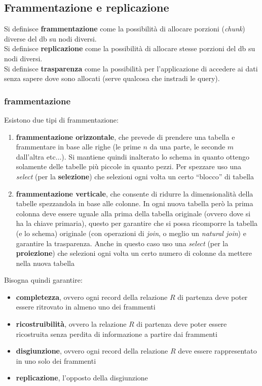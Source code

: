 \documentclass[a4paper,12pt, oneside]{book}
\begin{document}
\subsection{Frammentazione e replicazione}
Si definisce \textbf{frammentazione} come la possibilità di allocare porzioni
(\textit{chunk}) diverse del db su nodi diversi.\\
Si definisce \textbf{replicazione} come la possibilità di allocare stesse
porzioni del db su nodi diversi.\\
Si definisce \textbf{trasparenza} come la possibilità per l'applicazione di
accedere ai dati senza sapere dove sono allocati (serve qualcosa che instradi le
query).
\subsubsection{frammentazione}
Esistono due tipi di frammentazione:
\begin{enumerate}
  \item \textbf{frammentazione orizzontale}, che prevede di prendere una tabella
  e frammentare in base alle righe (le prime $n$ da una parte, le seconde $m$
  dall'altra etc$\ldots$). Si mantiene quindi inalterato lo schema in quanto
  ottengo solamente delle tabelle più piccole in quanto pezzi. Per spezzare uso
  una \textit{select} (per la \textbf{selezione}) che selezioni ogni volta un
  certo ``blocco'' di tabella 
  \item \textbf{frammentazione verticale}, che consente di ridurre la
  dimensionalità della tabelle spezzandola in base alle colonne. In ogni nuova
  tabella però la prima colonna deve essere uguale alla prima della tabella
  originale (ovvero dove si ha la chiave primaria), questo per garantire che si
  possa ricomporre la tabella (e lo schema) originale (con operazioni di
  \textit{join}, o meglio un \textit{natural join}) e garantire la
  trasparenza. Anche in questo caso uso 
  una \textit{select} (per la \textbf{proiezione}) che selezioni ogni volta un
  certo numero di colonne da mettere nella nuova tabella
\end{enumerate}
Bisogna quindi garantire:
\begin{itemize}
  \item \textbf{completezza}, ovvero ogni record della relazione $R$ di partenza
  deve poter essere ritrovato in almeno uno dei frammenti
  \item \textbf{ricostruibilità}, ovvero la relazione $R$ di partenza deve poter
  essere ricostruita senza perdita di informazione a partire dai frammenti
  \item \textbf{disgiunzione}, ovvero ogni record della relazione $R$ deve
  essere rappresentato in uno solo dei frammenti
  \item \textbf{replicazione}, l'opposto della disgiunzione
\end{itemize}
\end{document}
